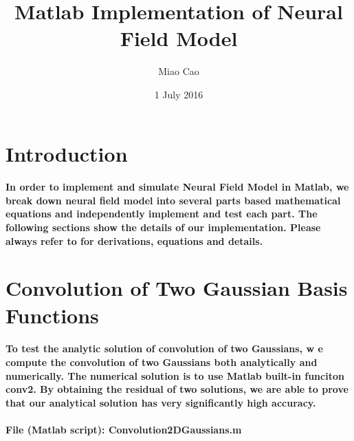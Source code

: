 \documentclass[a4paper, 12pt, english]{article}
\title{Matlab Implementation of Neural Field Model}
\author{Miao Cao}
\date{1 July 2016}
\begin{document}
\onehalfspacing

\begin{titlepage}\centering
\vspace*{\fill}
\maketitle
\vspace*{\fill}
\end{titlepage}

\tableofcontents

\newpage



\section{Introduction}
\paragraph{In order to implement and simulate Neural Field Model in Matlab, we break down
neural field model into several parts based mathematical equations and independently implement and test each part. The
following sections show the details of our implementation. Please always refer to
\cite{freestone2011data} for derivations, equations and details.}

\newpage



\section{Convolution of Two Gaussian Basis Functions}

\paragraph{To test the analytic solution of convolution of two Gaussians, w
e compute the convolution of two Gaussians both analytically and numerically.
The numerical solution is to use Matlab built-in funciton conv2. By obtaining
the residual of two solutions, we are able to prove that our analytical solution
has very significantly high accuracy.}

\paragraph{File (Matlab script): Convolution2DGaussians.m}
\end{document}

